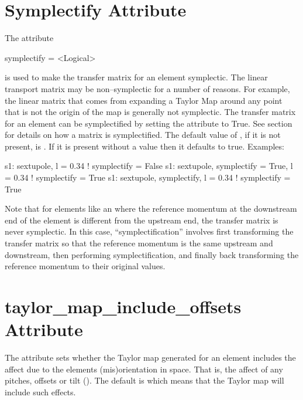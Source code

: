 \section{Symplectify Attribute}
\label{s:symp}

The  attribute
\begin{example}
  symplectify = <Logical>
\end{example}
is used to make the transfer matrix for an element symplectic. The
linear transport matrix may be non--symplectic for a number of
reasons.  For example, the linear matrix that comes from expanding a
Taylor Map around any point that is not the origin of the map is
generally not symplectic. The transfer matrix for an element can be
symplectified by setting the  attribute to True. See
section~ for details on how a matrix is
symplectified. The default value of , if it is not
present, is . If it is present without a value then it
defaults to true. Examples:
\begin{example}
  s1: sextupole, l = 0.34                       ! symplectify = False
  s1: sextupole, symplectify = True, l = 0.34   ! symplectify = True
  s1: sextupole, symplectify, l = 0.34          ! symplectify = True
\end{example}

\label{lcavity} Note that for elements like an  where the
reference momentum at the downstream end of the element is different
from the upstream end, the transfer matrix is never symplectic. In
this case, ``symplectification'' involves first transforming the
transfer matrix so that the reference momentum is the same upstream
and downstream, then performing symplectification, and finally back
transforming the reference momentum to their original values.

\section{taylor_map_include_offsets Attribute}
\label{s:mapoff}

The  attribute sets whether the Taylor map
generated for an element includes the affect due to the elements
(mis)orientation in space. That is, the affect of any pitches, offsets
or tilt (). The default is  which means that
the Taylor map will include such effects. 

